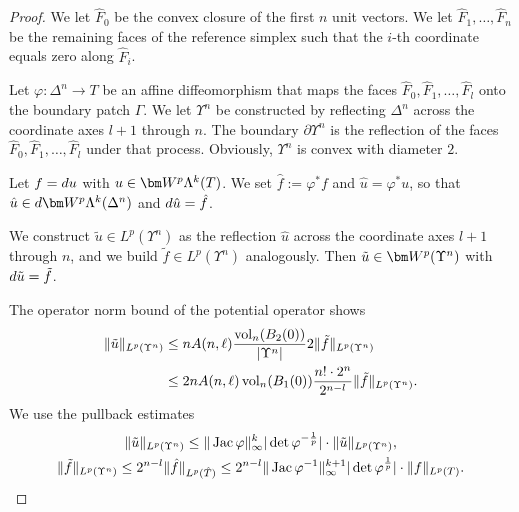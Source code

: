 \documentclass[a4paper]{article}
\begin{document}
\begin{proof}
    We let $\hat F_0$ be the convex closure of the first $n$ unit vectors. 
    We let $\hat F_1, \dots, \hat F_n$ be the remaining faces of the reference simplex 
    such that the $i$-th coordinate equals zero along $\hat F_i$.

    Let $\varphi : \Delta^{n} \rightarrow T$ be an affine diffeomorphism 
    that maps the faces $\hat F_{0}, \hat F_{1}, \dots, \hat F_{l}$ onto the boundary patch $\Gamma$. 
    We let $\Upsilon^{n}$ be constructed by reflecting $\Delta^{n}$ across the coordinate axes $l+1$ through $n$.
    The boundary $\partial\Upsilon^{n}$ is the reflection of the faces $\hat F_{0}, \hat F_{1}, \dots, \hat F_{l}$ under that process. 
    Obviously, $\Upsilon^{n}$ is convex with diameter $2$. 


    Let $f = d u$ with $u \in \bfW^{p}\Lambda^{k}(T)$.
    We set $\hat f := \varphi^{\ast} f$ and $\hat u = \varphi^{\ast} u$, 
    so that $\hat u \in \cartan \bfW^{p}\Lambda^{k}(\Delta^{n})$ and $d \hat u = \hat f$.

    We construct $\tilde u \in L^{p}(\Upsilon^{n})$ as the reflection $\hat u$ across the coordinate axes $l+1$ through $n$, and we build $\tilde f \in L^{p}(\Upsilon^{n})$ analogously.
    Then $\tilde u \in \bfW^{p}(\Upsilon^{n})$ with $d \tilde u = \tilde f$. 

    The operator norm bound of the potential operator shows 
    \begin{align*}
        \| \tilde u \|_{L^{p}(\Upsilon^{n})} 
        &\leq 
        n A(n,\ell) \frac{ \operatorname{vol}_{n}(B_2(0)) }{|\Upsilon^{n}|} 2 
        \| \tilde f \|_{L^{p}(\Upsilon^{n})}
        \\&
        \leq 
        2 n A(n,\ell) \operatorname{vol}_{n}(B_1(0)) \frac{ n! \cdot 2^{n} }{2^{n-l}} 
        \| \tilde f \|_{L^{p}(\Upsilon^{n})}
        .
    \end{align*}
    We use the pullback estimates 
    \begin{gather*}
        \| \tilde u \|_{L^{p}(\Upsilon^{n})} 
        \leq 
        \| \operatorname{{\rm Jac}}\varphi \|_{\infty}^{k}
        |\det\varphi^{-\frac{1}{p}}|
        \cdot 
        \| \tilde u \|_{L^{p}(\Upsilon^{n})} 
        ,
        \\
        \| \tilde f \|_{L^{p}(\Upsilon^{n})} 
        \leq 
        2^{n-l}
        \| \hat f \|_{L^{p}(\hat T)} 
        \leq 
        2^{n-l}
        \| \operatorname{{\rm Jac}}\varphi^{-1} \|_{\infty}^{k+1}
        |\det\varphi^{\frac{1}{p}}|
        \cdot 
        \| f \|_{L^{p}(T)} 
        .
    \end{gather*}
\end{proof}
\end{document}
